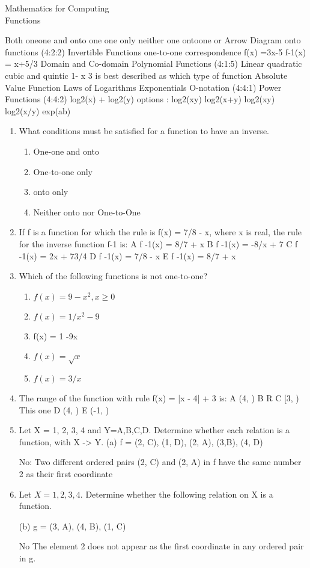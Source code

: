 \documentclass[12pt]{article}
\begin{document}
\begin{center}
\huge{Mathematics for Computing}\\
\LARGE{Functions}
\end{center}
\tableofcontents

Both oneone and onto
one one only
neither one ontoone or 
Arrow Diagram
onto functions (4:2:2)
Invertible Functions
one-to-one correspondence
f(x) =3x-5
f-1(x) = x+5/3
Domain and Co-domain
Polynomial Functions (4:1:5)
 Linear quadratic cubic and quintic
 1- x 3 is  best described as which type of function
Absolute Value Function
Laws of Logarithms
Exponentials
O-notation (4:4:1)
Power Functions (4:4:2)
log2(x)  + log2(y) 
options : log2(xy) log2(x+y) log2(xy) 
log2(x/y)
exp(ab)

\begin{enumerate}


\item 

What conditions must be satisfied for a function to have an inverse.
\begin{enumerate}
\item One-one and onto
\item One-to-one only
\item onto only
\item Neither onto nor One-to-One
\end{enumerate}
\item 

If f is a function for which the rule is f(x) = 7/8  - x, where x is real, the rule for the inverse function f-1 is:
A	f -1(x) = 8/7 + x
B	f -1(x) = -8/x + 7 
C	f -1(x) = 2x + 73/4 
D	f -1(x) = 7/8 - x  %
E	f -1(x) = 8/7 + x

\item 
Which of the following functions is not one-to-one?
\begin{enumerate}
\item 	$f(x) = 9 - x^2, x \geq 0$
\item 	$f(x) = 1/x^2  - 9$ %
\item	f(x) = 1 -9x
\item	$f(x) = \sqrt{x}$
\item	$f(x) = 3/x $
\end{enumerate}
\item 
The range of the function with rule f(x) = |x - 4| + 3 is:
A	(4, \infty)
B	R
C	[3, \infty) This one
D	(4, \infty)
E	(-1, \infty)

\item Let X = {1, 2, 3, 4} and Y={A,B,C,D}. Determine whether each relation is a function, with X -> Y.
(a) f = {(2, C), (1, D), (2, A), (3,B), (4, D)}

No:  Two different ordered pairs (2, C) and (2, A) in f have the same number 2 as their first coordinate

\item Let $X = {1, 2, 3, 4}$. Determine whether the following relation on X is a function.

(b) g = {(3, A), (4, B), (1, C)}

No The element 2 does not appear as the first coordinate in any ordered pair in g.
\end{enumerate}
\end{document}
